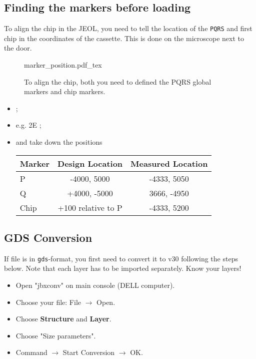 \subsection{Finding the markers before loading}
\label{sec:marker_location}

To align the chip in the JEOL, you need to tell  the location of the \texttt{PQRS} and first chip in the coordinates of the cassette. This is done on the microscope next to the door.

\begin{figure}[h]
  \centering
  \def\svgwidth{8cm}{marker_position.pdf_tex}
  \caption{\small To align the chip, both you need to defined the PQRS global markers and chip markers.\label{fig:marker_position}}
\end{figure}

\begin{framed}\noindent
  \ec
\end{framed}

\begin{itemize}
\item {};
\item  {}  e.g.   2E  \ira  {}\ec;
\item {} and take down  the positions \ira {}\ec
  
  \begin{table}[htbp]
    \centering
    \begin{tabular}{|l|c|c|}
      \hline
      \textbf{Marker} & \textbf{Design Location} & \textbf{Measured Location}\\\hline
      P & -4000, 5000 & -4333, 5050\\
      Q & +4000, -5000 & 3666, -4950\\
      Chip & +100 relative to P & -4333, 5200 \\\hline
    \end{tabular}
  \end{table}
\end{itemize}

\subsection{GDS Conversion}
If file is in \texttt{gds}-format, you first need to convert
it  to v30  following the  steps below.  Note that  each
layer has to be imported separately. Know your layers!
\begin{itemize}
\item Open "jbxconv" on main console (DELL computer).
\item Choose your file: File $\rightarrow$ Open.
\item Choose \textbf{Structure} and \textbf{Layer}.
\item Choose "Size parameters".
\item    Command    $\rightarrow$    Start    Conversion
  $\rightarrow$ OK.
\end{itemize}

